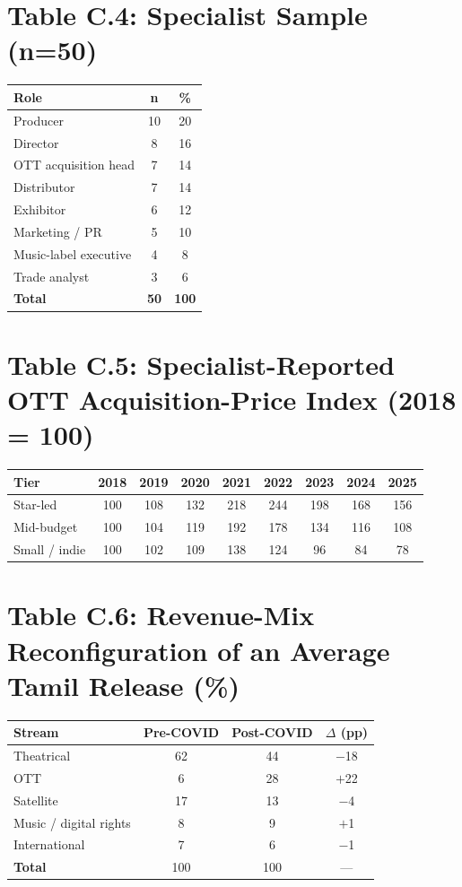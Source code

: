 \section{Table C.4: Specialist Sample (n=50)}
\begin{tabularx}{\textwidth}{X c c}
\toprule
\textbf{Role} & \textbf{n} & \textbf{\%}\\
\midrule
Producer                 & 10 & 20 \\
Director                 &  8 & 16 \\
OTT acquisition head     &  7 & 14 \\
Distributor              &  7 & 14 \\
Exhibitor                &  6 & 12 \\
Marketing / PR           &  5 & 10 \\
Music-label executive    &  4 &  8 \\
Trade analyst            &  3 &  6 \\
\midrule
\textbf{Total}           & \textbf{50} & \textbf{100} \\
\bottomrule
\end{tabularx}

\section{Table C.5: Specialist-Reported OTT Acquisition-Price
Index (2018 = 100)}
\begin{tabularx}{\textwidth}{l c c c c c c c c}
\toprule
\textbf{Tier} & \textbf{2018} & \textbf{2019} & \textbf{2020} &
\textbf{2021} & \textbf{2022} & \textbf{2023} & \textbf{2024} &
\textbf{2025}\\
\midrule
Star-led        & 100 & 108 & 132 & 218 & 244 & 198 & 168 & 156 \\
Mid-budget      & 100 & 104 & 119 & 192 & 178 & 134 & 116 & 108 \\
Small / indie   & 100 & 102 & 109 & 138 & 124 &  96 &  84 &  78 \\
\bottomrule
\end{tabularx}

\section{Table C.6: Revenue-Mix Reconfiguration of an Average Tamil Release (\%)}
\begin{tabularx}{\textwidth}{X c c c}
\toprule
\textbf{Stream} & \textbf{Pre-COVID} & \textbf{Post-COVID} &
\textbf{$\Delta$ (pp)}\\
\midrule
Theatrical              & 62 & 44 & $-$18 \\
OTT                     &  6 & 28 & $+$22 \\
Satellite               & 17 & 13 & $-$4  \\
Music / digital rights  &  8 &  9 & $+$1  \\
International           &  7 &  6 & $-$1  \\
\midrule
\textbf{Total}          & 100 & 100 & --- \\
\bottomrule
\end{tabularx}

